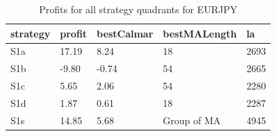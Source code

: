 \documentclass{tewiart}
\begin{document}
\newpage
\begin{table}[!t]
\caption{Profits for all strategy quadrants for EURJPY}
 \begin{center}
 \begin{tabular}{|l|l|l|l|l|}
 \hline \textbf{strategy} & \textbf{profit} & \textbf{bestCalmar} & \textbf{bestMALength} & \textbf{la} \\ \hline
S1a & 17.19 & 8.24 & 18 & 2693\\ \hline
S1b & -9.80 & -0.74 & 54 & 2665\\ \hline
S1c & 5.65 & 2.06 & 54 & 2280\\ \hline
S1d & 1.87 & 0.61 & 18 & 2287\\ \hline
S1s & 14.85 & 5.68 & Group of MA & 4945\\
\hline \end{tabular}
 \end{center}
 \end{table}
\FloatBarrier
\end{document}
